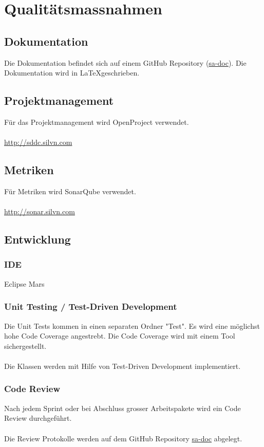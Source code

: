 \section{Qualitätsmassnahmen}
\subsection{Dokumentation}
Die Dokumentation befindet sich auf einem GitHub Repository 
(\href{https://github.com/hsr-sa-hs15-sddc/sa-doc}{sa-doc}).
Die Dokumentation wird in \LaTeX geschrieben.\\

\subsection{Projektmanagement}
Für das Projektmanagement wird OpenProject verwendet.\\
\\
\url{http://sddc.silvn.com}

\subsection{Metriken}
Für Metriken wird SonarQube verwendet.\\
\\
\url{http://sonar.silvn.com}

\subsection{Entwicklung}

\subsubsection{IDE}
Eclipse Mars\\

\subsubsection{Unit Testing / Test-Driven Development}
Die Unit Tests kommen in einen separaten Ordner "Test".
Es wird eine möglichst hohe Code Coverage angestrebt.
Die Code Coverage wird mit einem Tool sichergestellt.\\
\\
Die Klassen werden mit Hilfe von Test-Driven Development implementiert.

\subsubsection{Code Review}
Nach jedem Sprint oder bei Abschluss grosser Arbeitspakete wird ein Code Review durchgeführt.\\
\\
Die Review Protokolle werden auf dem GitHub Repository \href{https://github.com/hsr-sa-hs15-sddc/sa-doc}{sa-doc}
 abgelegt.


